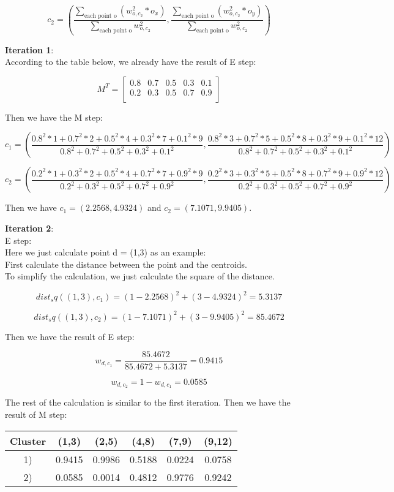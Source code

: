 \[
    c_2 = \left( 
    \frac{\sum_\text{each point o} (w_{o,c_2}^2 * o_x)}{\sum_\text{each point o} w_{o,c_2}^2}, 
    \frac{\sum_\text{each point o} (w_{o,c_2}^2 * o_y)}{\sum_\text{each point o} w_{o,c_2}^2} 
    \right)
\]

\textbf{Iteration 1}: \\
According to the table below, we already have the result of E step: 

\[
    M^T =
    \begin{bmatrix}
        0.8 & 0.7 & 0.5 & 0.3 & 0.1 \\
        0.2 & 0.3 & 0.5 & 0.7 & 0.9 \\
    \end{bmatrix}
\]

Then we have the M step:

\[
    c_1 = \left( 
        \frac{0.8^2*1+0.7^2*2+0.5^2*4+0.3^2*7+0.1^2*9}{0.8^2+0.7^2+0.5^2+0.3^2+0.1^2}, 
        \frac{0.8^2*3+0.7^2*5+0.5^2*8+0.3^2*9+0.1^2*12}{0.8^2+0.7^2+0.5^2+0.3^2+0.1^2} 
        \right)
\]

\[
    c_2 = \left( 
        \frac{0.2^2*1+0.3^2*2+0.5^2*4+0.7^2*7+0.9^2*9}{0.2^2+0.3^2+0.5^2+0.7^2+0.9^2}, 
        \frac{0.2^2*3+0.3^2*5+0.5^2*8+0.7^2*9+0.9^2*12}{0.2^2+0.3^2+0.5^2+0.7^2+0.9^2} 
        \right)
\]

Then we have $c_1 = (2.2568, 4.9324)$ and $c_2 = (7.1071, 9.9405)$.

\textbf{Iteration 2}: \\
E step: \\
Here we just calculate point d = (1,3) as an example: \\
First calculate the distance between the point and the centroids. \\
To simplify the calculation, we just calculate the square of the distance.

\[
    dist_sq((1,3), c_1) = (1-2.2568)^2 + (3-4.9324)^2 = 5.3137
\]

\[
    dist_sq((1,3), c_2) = (1-7.1071)^2 + (3-9.9405)^2 = 85.4672
\]

Then we have the result of E step:

\[
    w_{d,c_1} = \frac{85.4672}{85.4672+5.3137} = 0.9415
\]

\[
    w_{d,c_2} = 1 - w_{d,c_1} = 0.0585
\]

The rest of the calculation is similar to the first iteration. Then we have the result of M step:

\begin{table}[h]
    \centering
    \begin{tabular}{|c|c|c|c|c|c|}
    \hline
    Cluster & (1,3) & (2,5) & (4,8) & (7,9) & (9,12) \\
    \hline
    1)      & 0.9415   & 0.9986   & 0.5188   & 0.0224   & 0.0758    \\
    \hline
    2)      & 0.0585   & 0.0014   & 0.4812   & 0.9776   & 0.9242    \\
    \hline
    \end{tabular}
\end{table}

